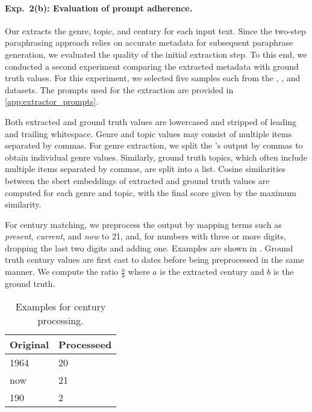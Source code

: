 \paragraph{Exp.\ 2(b): Evaluation of prompt adherence.}

Our \pextractor{} extracts the genre, topic, and century for each input text. 
Since the two-step paraphrasing approach relies on accurate metadata for subsequent paraphrase generation, we evaluated the quality of the initial extraction step. 
To this end, we conducted a second experiment comparing the extracted metadata with ground truth values. 
For this experiment, we selected five samples each from the \dataBlog{}, \dataGutenberg{}, and \dataStudent{} datasets.
The prompts used for the extraction are provided in \autoref{app:extractor_prompts}.

Both extracted and ground truth values are lowercased and stripped of leading and trailing whitespace. 
Genre and topic values may consist of multiple items separated by commas. 
For genre extraction, we split the \pextractor{}'s output by commas to obtain individual genre values. 
Similarly, ground truth topics, which often include multiple items separated by commas, are split into a list. 
Cosine similarities between the \ac{sbert} embeddings of extracted and ground truth values are computed for each genre and topic, with the final score given by the maximum similarity.

For century matching, we preprocess the \pextractor{} output by mapping terms such as \textit{present}, \textit{current}, and \textit{now} to 21, and, for numbers with three or more digits, dropping the last two digits and adding one. 
Examples are shown in . 
Ground truth century values are first cast to dates before being preprocessed in the same manner.
We compute the ratio $\frac{a}{b}$ where $a$ is the extracted century and $b$ is the ground truth.

\begin{table}[h]
\centering
\caption[Examples for century processing]{Examples for century processing.}
\label{tab:examples_extract_century}
\begin{tabular}{@{}ll@{}}
    \toprule
\textbf{Original} & \textbf{Processeed} \\
\midrule
1964              & 20                  \\
now               & 21                  \\
190               & 2     \\
\bottomrule             
\end{tabular}%
\end{table}

